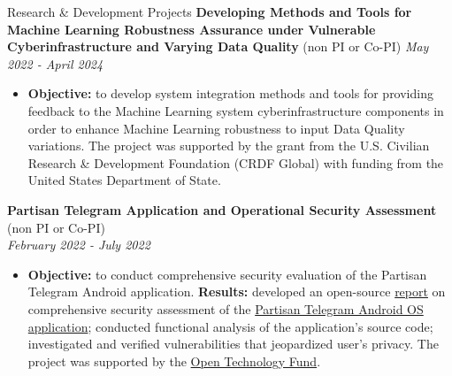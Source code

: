 \documentclass[10pt]{resume} %
\begin{document}
\begin{rSection}{Research \& Development Projects}
{\bf Developing Methods and Tools for Machine Learning Robustness Assurance under Vulnerable Cyberinfrastructure and Varying Data Quality} (non PI or Co-PI) \hspace*{\fill} {\em May 2022 - April 2024}
\vspace{-0.4cm}
\begin{itemize}
\itemsep-0.5em 
\item \textbf{Objective:} to develop system integration methods and tools for providing feedback to the Machine Learning system cyberinfrastructure components in order to enhance Machine Learning robustness to input Data Quality variations. 
The project was supported by the grant from the U.S. Civilian Research \& Development Foundation (CRDF Global) with funding from the United States Department of State. 
\end{itemize}

{\bf Partisan Telegram Application and Operational Security Assessment} (non PI or Co-PI)\\ \hspace*{\fill} {\em February 2022 - July 2022}
\vspace{-0.2cm}
\begin{itemize}
\itemsep-0.8em 
\item \textbf{Objective:} to conduct comprehensive security evaluation of the Partisan Telegram Android application. \textbf{Results:} developed an open-source \href{https://public.opentech.fund/documents/Vulnerability_Assessment_Report_-_OpenTech_Fund_2.pdf}{report} on comprehensive security assessment of the \href{https://github.com/wrwrabbit/Partisan-Telegram-Android}{Partisan Telegram Android OS application}; conducted functional analysis of the application's source code; investigated and verified vulnerabilities that jeopardized user's privacy. The project was supported by the \href{https://www.opentech.fund/news/an-application-and-operational-security-assessment-of-partisan-telegram/}{Open Technology Fund}.    
\end{itemize}


\end{rSection}
\end{document}
